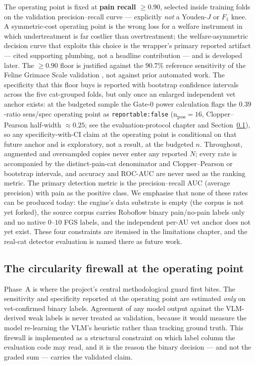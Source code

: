 The operating point is fixed at \textbf{pain recall $\geq 0.90$}, selected
inside training folds on the validation precision--recall curve --- explicitly
\emph{not} a Youden-$J$ or $F_1$ knee. A symmetric-cost operating point is the
wrong loss for a welfare instrument in which undertreatment is far costlier than
overtreatment; the welfare-asymmetric decision curve that exploits this choice
is the wrapper's primary reported artifact --- cited supporting plumbing, not a
headline contribution --- and is developed later. The $\geq 0.90$ floor
is justified against the $90.7\%$ reference sensitivity of the Feline Grimace
Scale validation \citep{evangelista2019}, not against prior automated work.
The specificity that this floor buys is reported with bootstrap confidence
intervals across the five cat-grouped folds, but only once an enlarged
independent vet anchor exists: at the budgeted sample the Gate-0 power
calculation flags the $0.39$-ratio sens/spec operating point as
\texttt{reportable:false} (n\textsubscript{pos}$=16$, Clopper--Pearson
half-width $\approx 0.25$; see the evaluation-protocol chapter and
Section~\ref{sec:eng-detector-firewall}), so any specificity-with-CI claim at the
operating point is conditional on that future anchor and is exploratory, not a
result, at the budgeted $n$. Throughout, augmented and oversampled copies never
enter any reported $N$; every rate is accompanied by the distinct-pain-cat
denominator and Clopper--Pearson or bootstrap intervals, and accuracy and
ROC-AUC are never used as the ranking metric. The primary detection metric is
the precision--recall AUC (average precision) with pain as the positive class.
We emphasise that none of these rates can be produced today: the engine's data
substrate is empty (the corpus is not yet forked), the source corpus carries
Roboflow binary pain/no-pain labels only and no native $0$--$10$ FGS labels, and
the independent per-AU vet anchor does not yet exist. These four constraints are
itemised in the limitations chapter, and the real-cat detector evaluation is
named there as future work.

\subsection{The circularity firewall at the operating point}
\label{sec:eng-detector-firewall}

Phase~A is where the project's central methodological guard first bites. The
sensitivity and specificity reported at the operating point are estimated
\emph{only} on vet-confirmed binary labels. Agreement of any model output
against the VLM-derived weak labels is never treated as validation, because it
would measure the model re-learning the VLM's heuristic rather than tracking
ground truth. This firewall is implemented as a structural constraint on which
label column the evaluation code may read, and it is the reason the binary
decision --- and not the graded sum --- carries the validated claim.


